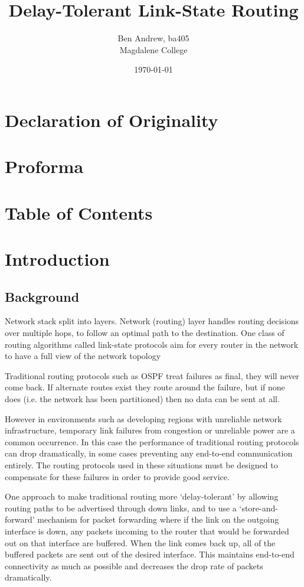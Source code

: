 \documentclass[10pt,twoside,a4paper]{article}
\title{Delay-Tolerant Link-State Routing}
\author{Ben Andrew, ba405\\Magdalene College}
\date{\today}
\begin{document}
\maketitle


\section{Declaration of Originality}

\section{Proforma}

\section{Table of Contents}

\section{Introduction}

\subsection{Background}

Network stack split into layers. Network (routing) layer handles routing decisions over multiple hops, to follow an optimal path to the destination. One class of routing algorithms called link-state protocols aim for every router in the network to have a full view of the network topology

Traditional routing protocols such as OSPF treat failures as final, they will never come back. If alternate routes exist they route around the failure, but if none does (i.e. the network has been partitioned) then no data can be sent at all.

However in environments such as developing regions with unreliable network infrastructure, temporary link failures from congestion or unreliable power are a common occurrence. In this case the performance of traditional routing protocols can drop dramatically, in some cases preventing any end-to-end communication entirely. The routing protocols used in these situations must be designed to compensate for these failures in order to provide good service.

One approach to make traditional routing more `delay-tolerant' by allowing routing paths to be advertised through down links, and to use a `store-and-forward' mechanism for packet forwarding where if the link on the outgoing interface is down, any packets incoming to the router that would be forwarded out on that interface are buffered. When the link comes back up, all of the buffered packets are sent out of the desired interface. This maintains end-to-end connectivity as much as possible and decreases the drop rate of packets dramatically.
\end{document}
